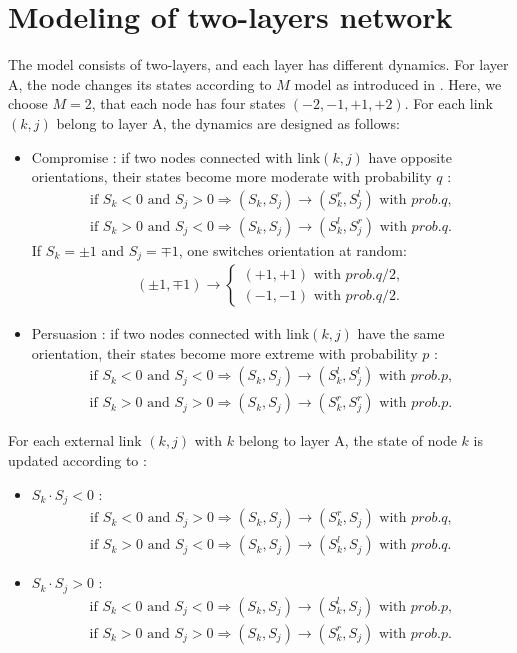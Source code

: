 \section{Modeling of two-layers network}
\label{sec:modeling of two layer network}
The model consists of two-layers, and each layer has different dynamics. For layer A, the node changes its states according to $M$ model as introduced in \parencite{rocca2014}. Here, we choose $M=2$, that each node has four states $(-2, -1, +1, +2)$. For each link $(k, j)$ belong to layer A,  the dynamics are designed as follows:
\begin{itemize}
	\item Compromise : if two nodes connected with link$(k, j)$ have opposite orientations, their states become more moderate with probability $q$ :
	\begin{align}
	\mbox{if } S_k<0 \mbox{ and } S_j>0  \Rightarrow (S_k, S_j) \rightarrow (S_k^r, S_j^l) \mbox{ with } prob.q,\\
	\mbox{if } S_k>0 \mbox{ and } S_j<0  \Rightarrow (S_k, S_j) \rightarrow (S_k^l, S_j^r) \mbox{ with } prob.q.
	\end{align}
	If $S_k = \pm1$ and $S_j = \mp1$, one switches orientation at random:
	\begin{align}
	(\pm 1, \mp 1)\rightarrow \left\{\begin{matrix}
	(+1, +1) \mbox{ with } prob.q/2,
	\\(-1, -1)\mbox{ with } prob.q/2.
	\end{matrix}\right.
	\end{align}
		
	\item Persuasion : if two nodes connected with link$(k, j)$ have the same orientation, their states become more extreme with probability $p$ :
	\begin{align}
	\mbox{if } S_k<0 \mbox{ and } S_j<0  \Rightarrow (S_k, S_j) \rightarrow (S_k^l, S_j^l) \mbox{ with } prob.p,\\
	\mbox{if } S_k>0 \mbox{ and } S_j>0  \Rightarrow (S_k, S_j) \rightarrow (S_k^r, S_j^r) \mbox{ with } prob.p.
	\end{align}
\end{itemize}
For each external link $(k,j)$ with $k$ belong to layer A, the state of node $k$ is updated according to :
\begin{itemize}
	\item $S_k \cdot S_j < 0$ :
	\begin{align}
	\mbox{if } S_k<0 \mbox{ and } S_j>0  \Rightarrow (S_k, S_j) \rightarrow (S_k^r, S_j) \mbox{ with } prob.q,\\
	\mbox{if } S_k>0 \mbox{ and } S_j<0  \Rightarrow (S_k, S_j) \rightarrow (S_k^l, S_j) \mbox{ with } prob.q.
	\end{align}
	\item $S_k \cdot S_j > 0$ :
	\begin{align}
	\mbox{if } S_k<0 \mbox{ and } S_j<0  \Rightarrow (S_k, S_j) \rightarrow (S_k^l, S_j) \mbox{ with } prob.p,\\
	\mbox{if } S_k>0 \mbox{ and } S_j>0  \Rightarrow (S_k, S_j) \rightarrow (S_k^r, S_j) \mbox{ with } prob.p.
	\end{align}
\end{itemize}
